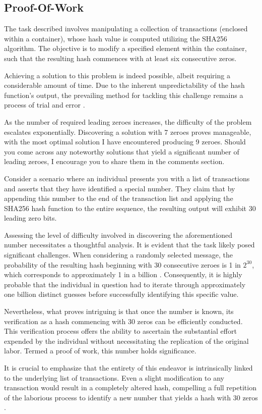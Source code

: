 \subsection{Proof-Of-Work}
The task described involves manipulating a collection of transactions (enclosed within a container), whose hash value is computed utilizing
the SHA256 algorithm. The objective is to modify a specified element within the container, such that the resulting hash commences with at
least six consecutive zeros.

Achieving a solution to this problem is indeed possible, albeit requiring a considerable amount of time. Due to the inherent unpredictability
of the hash function's output, the prevailing method for tackling this challenge remains a process of trial and error \cite{Dworkin2001}.

As the number of required leading zeroes increases, the difficulty of the problem escalates exponentially. Discovering a solution with 7
zeroes proves manageable, with the most optimal solution I have encountered producing 9 zeroes. Should you come across any noteworthy
solutions that yield a significant number of leading zeroes, I encourage you to share them in the comments section.

Consider a scenario where an individual presents you with a list of transactions and asserts that they have identified a special number.
They claim that by appending this number to the end of the transaction list and applying the SHA256 hash function to the entire sequence,
the resulting output will exhibit 30 leading zero bits.

Assessing the level of difficulty involved in discovering the aforementioned number necessitates a thoughtful analysis. It is evident that
the task likely posed significant challenges. When considering a randomly selected message, the probability of the resulting hash beginning
with 30 consecutive zeroes is 1 in $2^{30}$, which corresponds to approximately 1 in a billion \cite{Dworkin2001}. Consequently, it is highly
probable that the individual in question had to iterate through approximately one billion distinct guesses before successfully identifying
this specific value.

%

Nevertheless, what proves intriguing is that once the number is known, its verification as a hash commencing with 30 zeros can be efficiently
conducted. This verification process offers the ability to ascertain the substantial effort expended by the individual without necessitating
the replication of the original labor. Termed a proof of work, this number holds significance.

It is crucial to emphasize that the entirety of this endeavor is intrinsically linked to the underlying list of transactions. Even a slight
modification to any transaction would result in a completely altered hash, compelling a full repetition of the laborious process to identify
a new number that yields a hash with 30 zeros \cite{nakamoto2008bitcoin}.
